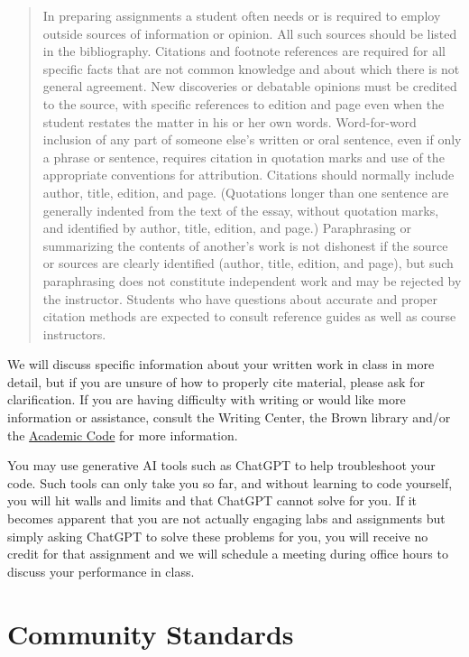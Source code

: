 \begin{quote}
In preparing assignments a student often needs or is required to employ outside sources of information or opinion. All such sources should be listed in the bibliography. Citations and footnote references are required for all specific facts that are not common knowledge and about which there is not general agreement. New discoveries or debatable opinions must be credited to the source, with specific references to edition and page even when the student restates the matter in his or her own words. Word-for-word inclusion of any part of someone else's written or oral sentence, even if only a phrase or sentence, requires citation in quotation marks and use of the appropriate conventions for attribution. Citations should normally include author, title, edition, and page. (Quotations longer than one sentence are generally indented from the text of the essay, without quotation marks, and identified by author, title, edition, and page.) Paraphrasing or summarizing the contents of another's work is not dishonest if the source or sources are clearly identified (author, title, edition, and page), but such paraphrasing does not constitute independent work and may be rejected by the instructor. Students who have questions about accurate and proper citation methods are expected to consult reference guides as well as course instructors.
\end{quote}


We will discuss specific information about your written work in class in more detail, but if you are unsure of how to properly cite material, please ask for clarification. If you are having difficulty with writing or would like more information or assistance, consult the Writing Center, the Brown library and/or the \href{https://www.brown.edu/academics/college/degree/policies/academic-code}{Academic Code} for more information.

You may use generative AI tools such as ChatGPT to help troubleshoot your code. Such tools can only take you so far, and without learning to code yourself, you will hit walls and limits and that ChatGPT cannot solve for you. If it becomes apparent that you are not actually engaging labs and assignments but simply asking ChatGPT to solve these problems for you, you will receive no credit for that assignment and we will schedule a meeting during office hours to discuss your performance in class.


\section{Community Standards}

